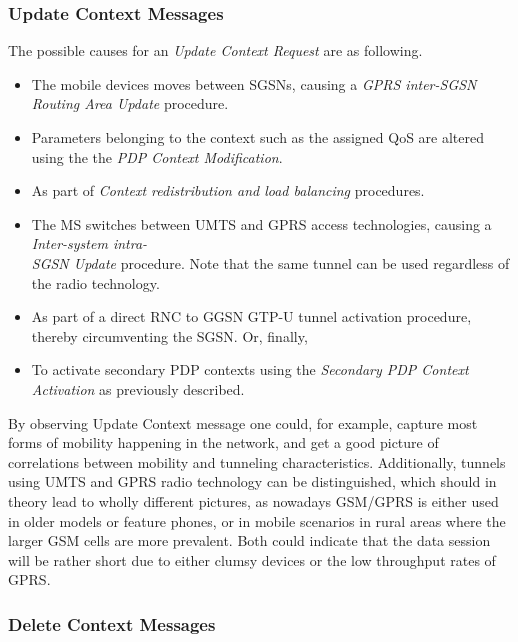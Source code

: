 \subsubsection{Update Context Messages}

The possible causes for an \textit{Update Context Request} are as following.

\begin{itemize}
	\item The mobile devices moves between \acp{SGSN}, causing a \textit{GPRS inter-SGSN Routing Area Update} procedure.
	\item Parameters belonging to the context such as the assigned \ac{QoS} are altered using the the \textit{PDP Context Modification}.
	\item As part of \textit{Context redistribution and load balancing} procedures.
	\item The \ac{MS} switches between \ac{UMTS} and \ac{GPRS} access technologies, causing a \textit{Inter-system intra- \\SGSN Update} procedure. Note that the same tunnel can be used regardless of the radio technology.
	\item As part of a direct \ac{RNC} to \ac{GGSN} GTP-U tunnel activation procedure, thereby circumventing the \ac{SGSN}. Or, finally, 
	\item To activate secondary PDP contexts using the \textit{Secondary PDP Context Activation} as previously described. 
\end{itemize}

By observing Update Context message one could, for example, capture most forms of mobility happening in the network, and get a good picture of correlations between mobility and tunneling characteristics. Additionally, tunnels using \ac{UMTS} and \ac{GPRS} radio technology can be distinguished, which should in theory lead to wholly different pictures, as nowadays GSM/GPRS is either used in older models or feature phones, or in mobile scenarios in rural areas where the larger GSM cells are more prevalent. Both could indicate that the data session will be rather short  due to either clumsy devices or the low throughput rates of \ac{GPRS}.

\subsubsection{Delete Context Messages}

